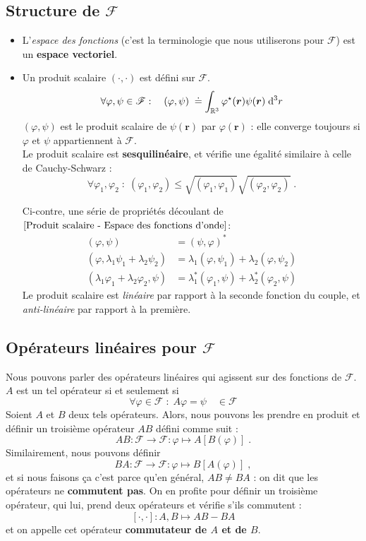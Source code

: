 \documentclass[../notesdecours.tex]{subfiles}
\begin{document}
\subsection{Structure de $\mathcal{F}$}
\begin{itemize}
\item L'\textit{espace des fonctions} (c'est la terminologie que nous utiliserons pour $\mathcal F$) est un \textbf{espace vectoriel}. \\
\item Un produit scalaire $(\cdot, \cdot)$ est défini sur $\mathcal F$.
\begin{equation}
\forall \varphi, \psi \in \mathcal F : \quad (\varphi, \psi)\;   \doteq \int_{\mathbb R ^3} \varphi ^\star(\bm{r}) \psi(\bm{r}) \; \mathrm{d} ^3 r
\label{Produit scalaire - Espace des fonctions d'onde}
\end{equation}
$(\varphi,\psi)$ est le produit scalaire de $\psi(\bm{r})$ par $\varphi(\bm{r})$ : elle converge toujours si $\varphi$ et $\psi$ appartiennent à $\mathcal{F}$.\\

Le produit scalaire est \textbf{sesquilinéaire}, et vérifie une égalité similaire à celle de Cauchy-Schwarz : 
$$ \forall \varphi_1, \varphi_2 \; : \; (\varphi_1, \varphi_2) \leq \sqrt{(\varphi_1, \varphi_1)}\sqrt{(\varphi_2, \varphi_2)} \; .$$

Ci-contre, une série de propriétés découlant de $\ref{Produit scalaire - Espace des fonctions d'onde}$:
\begin{align*}
(\varphi,\psi) &= (\psi,\varphi)^*\\
(\varphi,\lambda_1\psi_1 + \lambda_2\psi_2) &= \lambda_1 (\varphi,\psi_1) + \lambda_2 (\varphi,\psi_2)\\
(\lambda_1\varphi_1 + \lambda_2\varphi_2,\psi) &= \lambda_1^* (\varphi_1,\psi) + \lambda_2^* (\varphi_2,\psi)
\end{align*}
Le produit scalaire est \emph{linéaire} par rapport à la seconde fonction du couple, et \emph{anti-linéaire} par rapport à la première.
\end{itemize}

\subsection{Opérateurs linéaires pour $\mathcal F$}
Nous pouvons parler des opérateurs linéaires qui agissent sur des fonctions de $\mathcal F$. $A$ est un tel opérateur si et seulement si $$\forall \varphi \in \mathcal F \; : \; A\varphi = \psi \quad \in 
\mathcal F$$
Soient $A$ et $B$ deux tels opérateurs. Alors, nous pouvons les prendre en produit et définir un troisième opérateur $AB$ défini comme suit :
$$AB : \mathcal F \rightarrow \mathcal F : \varphi \longmapsto A[B(\varphi)]\; .$$
Similairement, nous pouvons définir
$$BA : \mathcal F \rightarrow \mathcal F : \varphi \longmapsto B[A(\varphi)]\; ,$$
et si nous faisons ça c'est parce qu'en général, $AB \neq BA$ : on dit que les opérateurs ne \textbf{commutent pas}. On en profite pour définir un troisième opérateur, qui lui, prend deux opérateurs et vérifie s'ils commutent :
$$[\cdot, \cdot] : A, B \longmapsto AB-BA$$
et on appelle cet opérateur \textbf{commutateur de $A$ et de $B$}.
\end{document}
